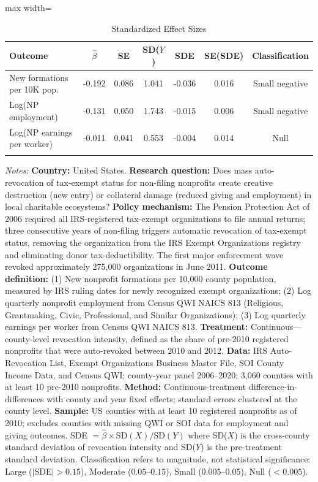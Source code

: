 \begin{table}[t]
\centering
\caption{Standardized Effect Sizes}
\label{tab:sde}
\begin{adjustbox}{max width=\textwidth}
\begin{tabular}{lcccccc}
\hline\hline
Outcome & $\hat{\beta}$ & SE & SD($Y$) & SDE & SE(SDE) & Classification \\
\hline
\addlinespace
New formations per 10K pop. & -0.192 & 0.086 & 1.041 & -0.036 & 0.016 & Small negative \\
Log(NP employment) & -0.131 & 0.050 & 1.743 & -0.015 & 0.006 & Small negative \\
Log(NP earnings per worker) & -0.011 & 0.041 & 0.553 & -0.004 & 0.014 & Null \\
\addlinespace
\hline\hline
\end{tabular}
\end{adjustbox}
\begin{tablenotes}[flushleft]\small
\item \textit{Notes:} \textbf{Country:} United States. \textbf{Research question:} Does mass auto-revocation of tax-exempt status for non-filing nonprofits create creative destruction (new entry) or collateral damage (reduced giving and employment) in local charitable ecosystems? \textbf{Policy mechanism:} The Pension Protection Act of 2006 required all IRS-registered tax-exempt organizations to file annual returns; three consecutive years of non-filing triggers automatic revocation of tax-exempt status, removing the organization from the IRS Exempt Organizations registry and eliminating donor tax-deductibility. The first major enforcement wave revoked approximately 275,000 organizations in June 2011. \textbf{Outcome definition:} (1) New nonprofit formations per 10,000 county population, measured by IRS ruling dates for newly recognized exempt organizations; (2) Log quarterly nonprofit employment from Census QWI NAICS 813 (Religious, Grantmaking, Civic, Professional, and Similar Organizations); (3) Log quarterly earnings per worker from Census QWI NAICS 813. \textbf{Treatment:} Continuous---county-level revocation intensity, defined as the share of pre-2010 registered nonprofits that were auto-revoked between 2010 and 2012. \textbf{Data:} IRS Auto-Revocation List, Exempt Organizations Business Master File, SOI County Income Data, and Census QWI; county-year panel 2006--2020; 3,060 counties with at least 10 pre-2010 nonprofits. \textbf{Method:} Continuous-treatment difference-in-differences with county and year fixed effects; standard errors clustered at the county level. \textbf{Sample:} US counties with at least 10 registered nonprofits as of 2010; excludes counties with missing QWI or SOI data for employment and giving outcomes. SDE $= \hat{\beta} \times \text{SD}(X) / \text{SD}(Y)$ where SD($X$) is the cross-county standard deviation of revocation intensity and SD($Y$) is the pre-treatment standard deviation. Classification refers to magnitude, not statistical significance: Large ($|$SDE$| > 0.15$), Moderate ($0.05$--$0.15$), Small ($0.005$--$0.05$), Null ($< 0.005$).
\end{tablenotes}
\end{table}
